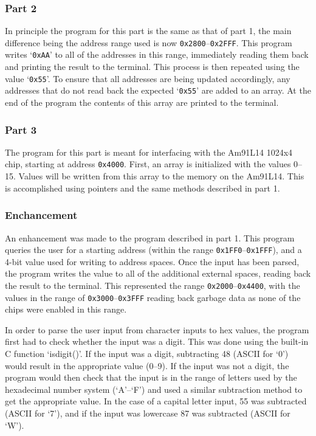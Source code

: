 \documentclass[12pt]{article}
\begin{document}
\subsubsection{Part 2}
In principle the program for this part is the same as that of part 1, the main difference being the address range used is now \texttt{0x2800}--\texttt{0x2FFF}. This program writes `\texttt{0xAA}' to all of the addresses in this range, immediately reading them back and printing the result to the terminal. This process is then repeated using the value `\texttt{0x55}'. To ensure that all addresses are being updated accordingly, any addresses that do not read back the expected `\texttt{0x55}' are added to an array. At the end of the program the contents of this array are printed to the terminal.

\subsubsection{Part 3}
The program for this part is meant for interfacing with the Am91L14 1024x4 chip, starting at address \texttt{0x4000}. First, an array is initialized with the values 0--15. Values will be written from this array to the memory on the Am91L14. This is accomplished using pointers and the same methods described in part 1. 

\subsubsection{Enchancement}
An enhancement was made to the program described in part 1. This program queries the user for a starting address (within the range \texttt{0x1FF0}--\texttt{0x1FFF}), and a 4-bit value used for writing to address spaces. Once the input has been parsed, the program writes the value to all of the additional external spaces, reading back the result to the terminal. This represented the range \texttt{0x2000}--\texttt{0x4400}, with the values in the range of \texttt{0x3000}--\texttt{0x3FFF} reading back garbage data as none of the chips were enabled in this range. 

In order to parse the user input from character inputs to hex values, the program first had to check whether the input was a digit. This was done using the built-in C function `isdigit()'. If the input was a digit, subtracting 48 (ASCII for `0') would result in the appropriate value (0--9). If the input was not a digit, the program would then check that the input is in the range of letters used by the hexadecimal number system (`A'--`F') and used a similar subtraction method to get the appropriate value. In the case of a capital letter input, 55 was subtracted (ASCII for `7'), and if the input was lowercase 87 was subtracted (ASCII for `W').
\end{document}
